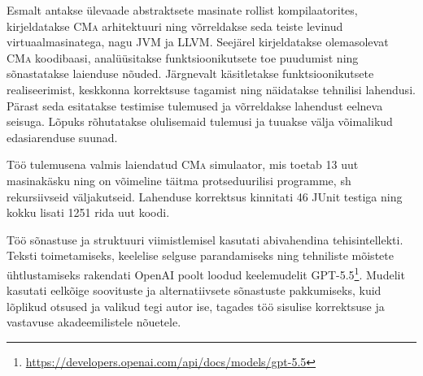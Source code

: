 Esmalt antakse ülevaade abstraktsete masinate rollist kompilaatorites, kirjeldatakse \textsc{CMa} arhitektuuri ning võrreldakse seda teiste levinud virtuaalmasinatega, nagu \textsc{JVM} ja \textsc{LLVM}. Seejärel kirjeldatakse olemasolevat \textsc{CMa} koodibaasi, analüüsitakse funktsioonikutsete toe puudumist ning sõnastatakse laienduse nõuded. Järgnevalt käsitletakse funktsioonikutsete realiseerimist, keskkonna korrektsuse tagamist ning näidatakse tehnilisi lahendusi. Pärast seda esitatakse testimise tulemused ja võrreldakse lahendust eelneva seisuga. Lõpuks rõhutatakse olulisemaid tulemusi ja tuuakse välja võimalikud edasiarenduse suunad.

Töö tulemusena valmis laiendatud \textsc{CMa} simulaator, mis toetab 13 uut masinakäsku ning on võimeline täitma protseduurilisi programme, sh rekursiivseid väljakutseid. Lahenduse korrektsus kinnitati 46 JUnit testiga ning kokku lisati 1251 rida uut koodi.

Töö sõnastuse ja struktuuri viimistlemisel kasutati abivahendina tehisintellekti. Teksti toimetamiseks, keelelise selguse parandamiseks ning tehniliste mõistete ühtlustamiseks rakendati OpenAI poolt loodud keelemudelit GPT-5.5\footnote{\url{https://developers.openai.com/api/docs/models/gpt-5.5}}. Mudelit kasutati eelkõige soovituste ja alternatiivsete sõnastuste pakkumiseks, kuid lõplikud otsused ja valikud tegi autor ise, tagades töö sisulise korrektsuse ja vastavuse akadeemilistele nõuetele.
